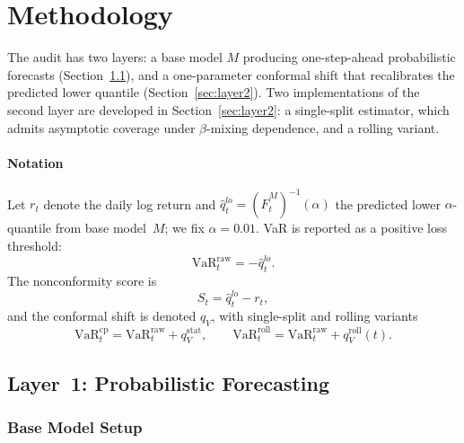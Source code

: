 \documentclass[preprint,11pt,authoryear]{elsarticle}
\newcommand{\VaR}{\mathrm{VaR}}
\newcommand{\1}{\boldsymbol{1}}
\begin{document}
	
\section{Methodology}
\label{sec:framework}

The audit has two layers: a base model $M$ producing one-step-ahead probabilistic forecasts (Section~\ref{sec:layer1}), and a one-parameter conformal shift that recalibrates the predicted lower quantile (Section~\ref{sec:layer2}). Two implementations of the second layer are developed in Section~\ref{sec:layer2}: a single-split estimator, which admits asymptotic coverage under $\beta$-mixing dependence, and a rolling variant.

\paragraph*{Notation}
Let $r_t$ denote the daily log return and $\hat q_t^{lo} = (\widehat F_t^M)^{-1}(\alpha)$ the predicted lower $\alpha$-quantile from base model~$M$; we fix $\alpha = 0.01$. VaR is reported as a positive loss threshold:
\begin{equation}
	\label{eq:var_raw}
	\VaR_t^{\mathrm{raw}} = -\hat q_t^{lo}.
\end{equation}
The nonconformity score is
\begin{equation}
	\label{eq:score}
	S_t = \hat q_t^{lo} - r_t,
\end{equation}
and the conformal shift is denoted $q_V$, with single-split and rolling variants
\begin{equation}
	\label{eq:var_cp_roll}
	\VaR_t^{\mathrm{cp}} = \VaR_t^{\mathrm{raw}} + q_V^{\mathrm{stat}},
	\qquad
	\VaR_t^{\mathrm{roll}} = \VaR_t^{\mathrm{raw}} + q_V^{\mathrm{roll}}(t).
\end{equation}

\subsection{Layer~1: Probabilistic Forecasting}
\label{sec:layer1}

\subsubsection{Base Model Setup}
\label{sec:setup}
\end{document}
